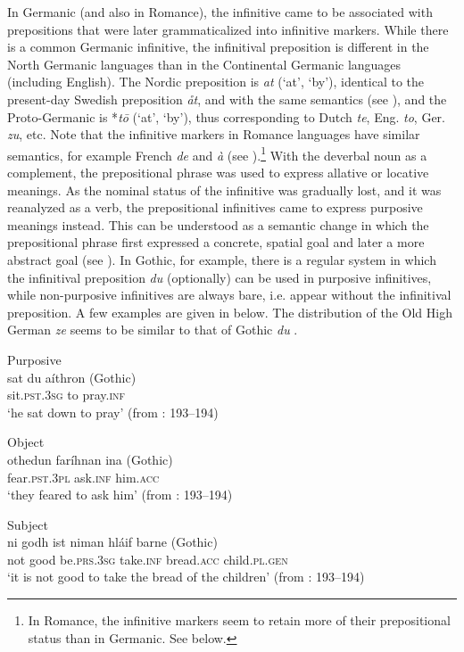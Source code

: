 \documentclass[output=paper]{langscibook}
\begin{document}
In Germanic (and also in Romance), the infinitive came to be associated with prepositions that were later grammaticalized into infinitive markers. While there is a common Germanic infinitive, the infinitival preposition is different in the North Germanic languages than in the Continental Germanic languages (including English). The Nordic preposition is \textit{at} (‘at’, ‘by’), identical to the present-day Swedish preposition \textit{åt}, and with the same semantics (see \citealt{Hellquist1948}), and the Proto-Germanic is *\textit{tō} (‘at’, ‘by’), thus corresponding to Dutch \textit{te}, Eng. \textit{to}, Ger. \textit{zu}, etc. Note that the infinitive markers in Romance languages have similar semantics, for example French \textit{de} and \textit{à} (see \citealt[15]{Beckman1934}).\footnote{In Romance, the infinitive markers seem to retain more of their prepositional status than in Germanic. See  below.}  With the deverbal noun as a complement, the prepositional phrase was used to express allative or locative meanings. As the nominal status of the infinitive was gradually lost, and it was reanalyzed as a verb, the prepositional infinitives came to express purposive meanings instead. This can be understood as a semantic change in which the prepositional phrase first expressed a concrete, spatial goal and later a more abstract goal (see \citealt{Los2005}). In Gothic, for example, there is a regular system in which the infinitival preposition \textit{du} (optionally) can be used in purposive infinitives, while non-purposive infinitives are always bare, i.e. appear without the infinitival preposition. A few examples are given in  below. The distribution of the Old High German \textit{ze} seems to be similar to that of Gothic \textit{du} \citep{Haspelmath1989}. 

\ea
\label{ex:kalm:3}
\ea Purposive\\\label{ex:kalm:3a}
\gll sat du aíthron (Gothic)\\
sit.\textsc{pst.3sg} to pray.\textsc{inf}\\
\glt ‘he sat down to pray’ (from \citealt{Wright1954}: 193–194) 

\ex Object\\\label{ex:kalm:3b}
\gll othedun faríhnan ina (Gothic)\\
fear\textsc{.pst.3pl} ask.\textsc{inf} him.\textsc{acc}\\
\glt ‘they feared to ask him’ (from \citealt{Wright1954}: 193–194)

\ex Subject\\ \label{ex:kalm:3c}
\gll ni godh ist niman hláif barne (Gothic)\\
not good be.\textsc{prs.3sg} take.\textsc{inf} bread.\textsc{acc} child.\textsc{pl.gen}\\
\glt‘it is not good to take the bread of the children’ (from \citealt{Wright1954}: 193–194)
\z
\z
\end{document}
